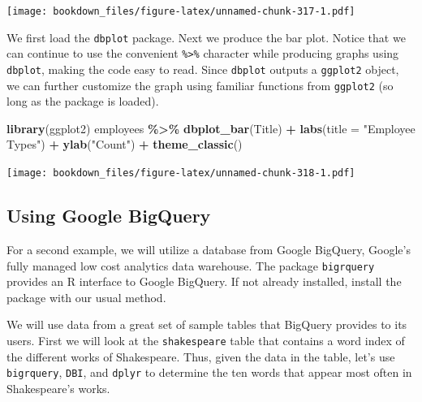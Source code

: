 \documentclass[
]{krantz}
\makeatletter
\newenvironment{Shaded}{\begin{snugshade}}{\end{snugshade}}
\newcommand{\DataTypeTok}[1]{\textcolor[rgb]{0.27,0.27,0.27}{#1}}
\newcommand{\KeywordTok}[1]{\textcolor[rgb]{0.27,0.27,0.27}{\textbf{#1}}}
\newcommand{\NormalTok}[1]{#1}
\newcommand{\OperatorTok}[1]{\textcolor[rgb]{0.43,0.43,0.43}{\textbf{#1}}}
\newcommand{\StringTok}[1]{\textcolor[rgb]{0.5,0.5,0.5}{#1}}
\newenvironment{kframe}{%
\medskip{}
\setlength{\fboxsep}{.8em}
 \def\at@end@of@kframe{}%
 \ifinner\ifhmode%
  \def\at@end@of@kframe{\end{minipage}}%
  \begin{minipage}{\columnwidth}%
 \fi\fi%
 \def\FrameCommand##1{\hskip\@totalleftmargin \hskip-\fboxsep
 \colorbox{shadecolor}{##1}\hskip-\fboxsep
     \hskip-\linewidth \hskip-\@totalleftmargin \hskip\columnwidth}%
 \MakeFramed {\advance\hsize-\width
   \@totalleftmargin\z@ \linewidth\hsize
   \@setminipage}}%
 {\par\unskip\endMakeFramed%
 \at@end@of@kframe}
\renewenvironment{Shaded}{\begin{kframe}}{\end{kframe}}
\makeatother
\begin{document}
\texttt{[image: bookdown\_files/figure-latex/unnamed-chunk-317-1.pdf]}

We first load the \texttt{dbplot} package. Next we produce the bar plot. Notice that we can continue to use the convenient \texttt{\%\textgreater{}\%} character while producing graphs using \texttt{dbplot}, making the code easy to read. Since \texttt{dbplot} outputs a \texttt{ggplot2} object, we can further customize the graph using familiar functions from \texttt{ggplot2} (so long as the package is loaded).

\begin{Shaded}
\begin{Highlighting}[]
\KeywordTok{library}\NormalTok{(ggplot2)}
\NormalTok{employees }\OperatorTok{\%\textgreater{}\%}\StringTok{ }
\StringTok{  }\KeywordTok{dbplot\_bar}\NormalTok{(Title) }\OperatorTok{+}\StringTok{ }
\StringTok{  }\KeywordTok{labs}\NormalTok{(}\DataTypeTok{title =} \StringTok{"Employee Types"}\NormalTok{) }\OperatorTok{+}\StringTok{ }
\StringTok{  }\KeywordTok{ylab}\NormalTok{(}\StringTok{"Count"}\NormalTok{) }\OperatorTok{+}\StringTok{ }
\StringTok{  }\KeywordTok{theme\_classic}\NormalTok{()}
\end{Highlighting}
\end{Shaded}

\texttt{[image: bookdown\_files/figure-latex/unnamed-chunk-318-1.pdf]}

\hypertarget{using-google-bigquery}{%
\subsection{Using Google BigQuery}\label{using-google-bigquery}}

For a second example, we will utilize a database from Google BigQuery, Google's fully managed low cost analytics data warehouse. The package \texttt{bigrquery} provides an R interface to Google BigQuery. If not already installed, install the package with our usual method.

We will use data from a great set of sample tables that BigQuery provides to its users. First we will look at the \texttt{shakespeare} table that contains a word index of the different works of Shakespeare. Thus, given the data in the table, let's use \texttt{bigrquery}, \texttt{DBI}, and \texttt{dplyr} to determine the ten words that appear most often in Shakespeare's works.
\end{document}
